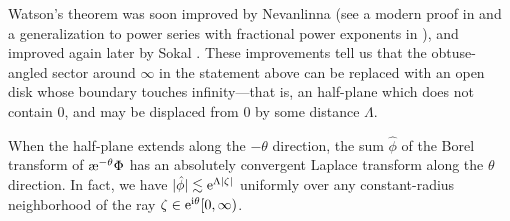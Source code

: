 \documentclass[pdftex]{sigma}
\newcommand{\aexp}{\text{\rm \ae}}
\numberwithin{equation}{section}
\begin{document}
Watson's theorem was soon improved by Nevanlinna \cite{nevanlinna} (see a modern proof in \cite[Theorem~B.15]{nikolaev2023exact} and a generalization to power series with fractional power exponents in \cite{delabaere--rosoamanana}), and improved again later by Sokal \cite{sokal1980improvement}. These improvements tell us that the obtuse-angled sector around $\infty$ in the statement above can be replaced with an open disk whose boundary touches infinity---that is, an half-plane which does not contain $0$, and may be displaced from $0$ by some distance $\Lambda$.
\begin{center}
\end{center}
When the half-plane extends along the $-\theta$ direction, the sum $\hat{\phi}$ of the Borel transform of $\aexp^{-\theta} \Phi$ has an absolutely convergent Laplace transform along the $\theta$ direction. In fact, we have $|\hat{\phi}| \lesssim {\rm e}^{\Lambda |\zeta|}$ uniformly over any constant-radius neighborhood of the ray $\zeta \in {\rm e}^{{\rm i}\theta}[0, \infty)$.
\begin{center}
\end{center}
\end{document}
